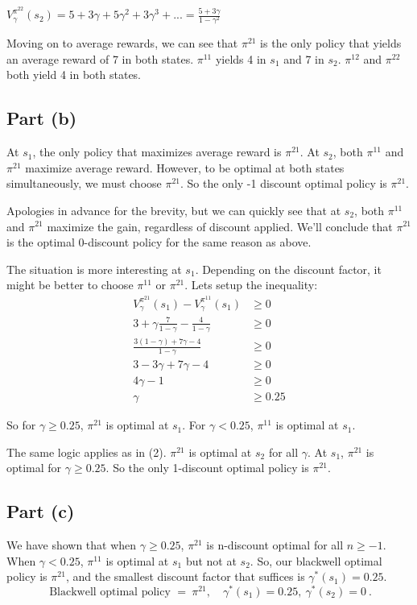 \documentclass[12pt]{article}
\begin{document}
$V^{\pi^{22}}_\gamma(s_2) = 5 + 3\gamma + 5\gamma^2 + 3\gamma^3 + ... = \frac{5 + 3\gamma}{1-\gamma^2}$

\medskip
Moving on to average rewards, we can see that $\pi^{21}$ is the only policy that yields an average reward of 7
in both states. $\pi^{11}$ yields 4 in $s_1$ and 7 in $s_2$. $\pi^{12}$ and $\pi^{22}$ both yield 4
in both states.

\newpage
\subsection*{Part (b)}
At $s_1$, the only policy that maximizes average reward is $\pi^{21}$. At $s_2$, both $\pi^{11}$ and $\pi^{21}$
maximize average reward. However, to be optimal at both states simultaneously, we must choose $\pi^{21}$.
So the only -1 discount optimal policy is $\pi^{21}$.

Apologies in advance for the brevity, but we can quickly see that at $s_2$, both $\pi^{11}$ and $\pi^{21}$
maximize the gain, regardless of discount applied. We'll conclude that $\pi^{21}$ is the optimal 0-discount policy
for the same reason as above.

\medskip
The situation is more interesting at $s_1$. Depending on the discount factor, it might be better to
choose $\pi^{11}$ or $\pi^{21}$. Lets setup the inequality:
\begin{align*}
		V^{\pi^{21}}_\gamma(s_1) - V^{\pi^{11}}_\gamma(s_1) &\geq 0\\
		3 + \gamma\frac{7}{1-\gamma} - \frac{4}{1-\gamma} &\geq 0\\
		\frac{3(1-\gamma) + 7\gamma - 4}{1-\gamma} &\ge 0 \\
		3 - 3\gamma + 7\gamma - 4 &\ge 0 \\
		4\gamma - 1 &\ge 0 \\
		\gamma &\ge 0.25
\end{align*}

So for $\gamma \geq 0.25$, $\pi^{21}$ is optimal at $s_1$. For $\gamma < 0.25$, $\pi^{11}$ is optimal at $s_1$.

The same logic applies as in (2). $\pi^{21}$ is optimal at $s_2$ for all $\gamma$. At $s_1$, $\pi^{21}$ is
optimal for $\gamma \geq 0.25$. So the only 1-discount optimal policy is $\pi^{21}$.

\medskip
\subsection*{Part (c)}
We have shown that when $\gamma\ge 0.25$, $\pi^{21}$ is n-discount optimal for all $n\ge -1$.
When $\gamma<0.25$, $\pi^{11}$ is optimal at $s_1$ but not at $s_2$. So, our blackwell optimal policy
is $\pi^{21}$, and the smallest discount factor that suffices is $\gamma^\ast(s_1)=0.25$.
\[
		\boxed{\ \text{Blackwell optimal policy }=\ \pi^{21},\quad \gamma^\ast(s_1)=0.25,\ \gamma^\ast(s_2)=0\ }.
\]

\end{document}
